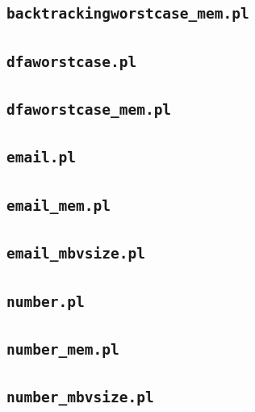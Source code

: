 \subsection{\texttt{backtrackingworstcase\_mem.pl}}
\label{sec:backtrackingworstcase_mem.pl}



\subsection{\texttt{dfaworstcase.pl}}
\label{sec:dfaworstcase.pl}



\subsection{\texttt{dfaworstcase\_mem.pl}}
\label{sec:dfaworstcase_mem.pl}



\subsection{\texttt{email.pl}}
\label{sec:email.pl}



\subsection{\texttt{email\_mem.pl}}
\label{sec:email_mem.pl}



\subsection{\texttt{email\_mbvsize.pl}}
\label{sec:email_mbvsize.pl}



\subsection{\texttt{number.pl}}
\label{sec:number.pl}



\subsection{\texttt{number\_mem.pl}}
\label{sec:number_mem.pl}



\subsection{\texttt{number\_mbvsize.pl}}
\label{sec:number_mbvsize.pl}





